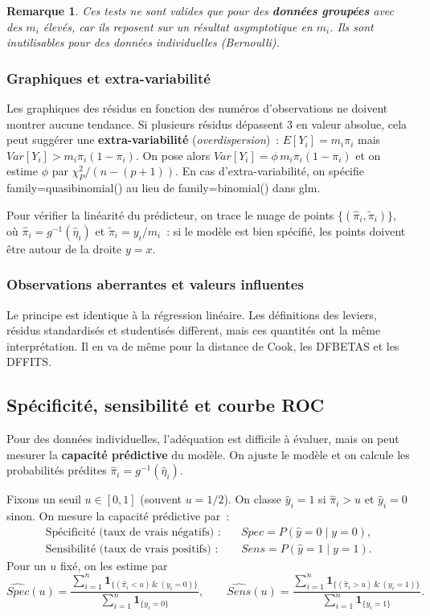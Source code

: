 \documentclass[11pt,letterpaper]{article}
\newtheorem{remarque}{Remarque}[section]
\begin{document}
\begin{remarque}
Ces tests ne sont valides que pour des \textbf{données groupées} avec des $m_i$ élevés, car ils reposent sur un résultat asymptotique en $m_i$. Ils sont inutilisables pour des données individuelles (Bernoulli).
\end{remarque}

\subsubsection{Graphiques et extra-variabilité}

Les graphiques des résidus en fonction des numéros d'observations ne doivent montrer aucune tendance. Si plusieurs résidus dépassent 3 en valeur absolue, cela peut suggérer une \textbf{extra-variabilité} (\textit{overdispersion})~: $E[Y_i] = m_i\pi_i$ mais $Var[Y_i] > m_i\pi_i(1-\pi_i)$. On pose alors $Var[Y_i] = \phi\, m_i\pi_i(1-\pi_i)$ et on estime $\phi$ par $\chi^2_P/(n-(p+1))$. En cas d'extra-variabilité, on spécifie \textsf{family=quasibinomial()} au lieu de \textsf{family=binomial()} dans \textsf{glm}.

Pour vérifier la linéarité du prédicteur, on trace le nuage de points $\{(\hat\pi_i, \tilde\pi_i)\}$, où $\hat\pi_i = g^{-1}(\hat\eta_i)$ et $\tilde\pi_i = y_i/m_i$~: si le modèle est bien spécifié, les points doivent être autour de la droite $y=x$.

\subsubsection{Observations aberrantes et valeurs influentes}

Le principe est identique à la régression linéaire. Les définitions des leviers, résidus standardisés et studentisés diffèrent, mais ces quantités ont la même interprétation. Il en va de même pour la distance de Cook, les DFBETAS et les DFFITS.

\subsection{Spécificité, sensibilité et courbe ROC}
\label{subsec:roc}

Pour des données individuelles, l'adéquation est difficile à évaluer, mais on peut mesurer la \textbf{capacité prédictive} du modèle. On ajuste le modèle et on calcule les probabilités prédites $\hat\pi_i = g^{-1}(\hat\eta_i)$.

Fixons un seuil $u \in [0,1]$ (souvent $u=1/2$). On classe $\hat y_i = 1$ si $\hat\pi_i > u$ et $\hat y_i = 0$ sinon. On mesure la capacité prédictive par~:
\begin{align*}
\text{Spécificité (taux de vrais négatifs)~:}\quad & Spec = P(\hat y = 0 \mid y = 0),\\
\text{Sensibilité (taux de vrais positifs)~:}\quad & Sens = P(\hat y = 1 \mid y = 1).
\end{align*}
Pour un $u$ fixé, on les estime par
$$\widehat{Spec}(u) = \frac{\sum_{i=1}^n \mathbf{1}_{\{(\hat\pi_i < u)\,\&\,(y_i = 0)\}}}{\sum_{i=1}^n \mathbf{1}_{\{y_i = 0\}}},
\qquad
\widehat{Sens}(u) = \frac{\sum_{i=1}^n \mathbf{1}_{\{(\hat\pi_i > u)\,\&\,(y_i = 1)\}}}{\sum_{i=1}^n \mathbf{1}_{\{y_i = 1\}}}.$$
\end{document}
